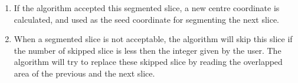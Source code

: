 \documentclass[letterpaper,10pt,english]{sphinxmanual}
\begin{document}
\begin{enumerate}
\begin{quote}
\begin{sphinxadmonition}{note}{Note:}
\sphinxAtStartPar
To determine whether a segmented slice is acceptable, different conditions are verified for {\hyperref[\detokenize{glossary:term-Descending-Aorta}]{}} and {\hyperref[\detokenize{glossary:term-Ascending-Aorta}]{}}. These conditions check are all invovled with the {\hyperref[\detokenize{glossary:term-Qualified-coefficient}]{}}, which is decided by the user. In simple terms, the larger the {\hyperref[\detokenize{glossary:term-Qualified-coefficient}]{}}, the looser condition on accepting a segmented slice.
\end{sphinxadmonition}
\end{quote}

\item {} 
\sphinxAtStartPar
If the algorithm accepted this segmented slice, a new centre coordinate is calculated, and used as the seed coordinate for segmenting the next slice.

\item {} 
\sphinxAtStartPar
When a segmented slice is not acceptable, the algorithm will skip this slice if the number of skipped slice is less then the integer given by the user. The algorithm will try to replace these skipped slice by reading the overlapped area of the previous and the next slice.

\end{enumerate}
\end{document}
